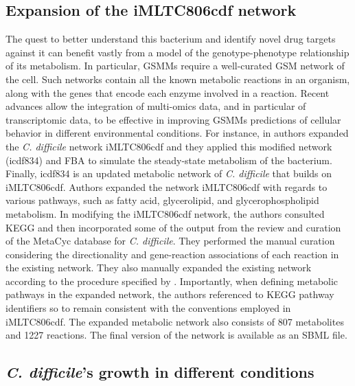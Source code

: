 \documentclass{article}
\begin{document}
\subsection{Expansion of the iMLTC806cdf network}

The quest to better understand this bacterium and identify novel drug targets against it can benefit vastly from a model of the genotype-phenotype relationship of its metabolism. In particular, GSMMs require a well-curated GSM network of the cell. Such networks contain all the known metabolic reactions in an organism, along with the genes that encode each enzyme involved in a reaction. Recent advances allow the integration of multi-omics data, and in particular of transcriptomic data, to be effective in improving GSMMs predictions of cellular behavior in different environmental conditions. For instance, in \cite{Kashaf} authors expanded the {\it C. difficile} network iMLTC806cdf and they applied this modified network (icdf834) and FBA to simulate the steady-state metabolism of the bacterium. Finally, icdf834 is an updated metabolic network of {\it C. difficile} that builds on iMLTC806cdf. Authors expanded the network iMLTC806cdf with regards to various pathways, such as fatty acid, glycerolipid, and glycerophospholipid metabolism. In modifying the iMLTC806cdf network, the authors consulted KEGG and then incorporated some of the output from the review and curation of the MetaCyc database for {\it C. difficile}. They performed the manual curation considering the directionality and gene-reaction associations of each reaction in the existing network. They also manually expanded the existing network according to the procedure specified by \cite{Thiele}. Importantly, when defining metabolic pathways in the expanded network, the authors referenced to KEGG pathway identifiers so to remain consistent with the conventions employed in iMLTC806cdf. The expanded metabolic network also consists of 807 metabolites and 1227 reactions. The final version of the network is available as an SBML file.

\subsection{{\it C. difficile}’s growth in different conditions}
\end{document}
